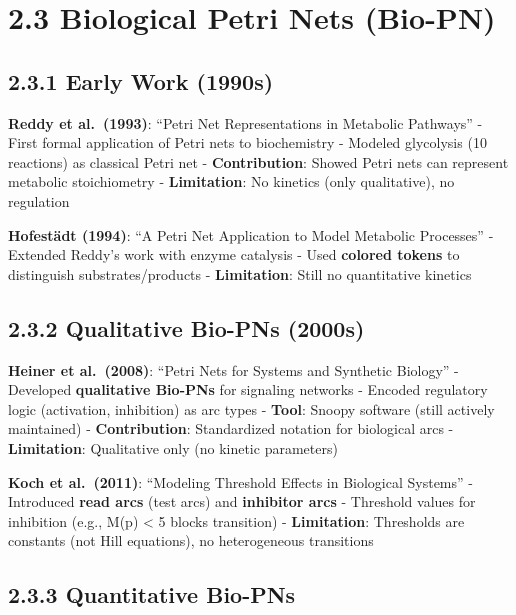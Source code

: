 \hypertarget{biological-petri-nets-bio-pn}{%
\section{2.3 Biological Petri Nets
(Bio-PN)}\label{biological-petri-nets-bio-pn}}

\hypertarget{early-work-1990s}{%
\subsection{2.3.1 Early Work (1990s)}\label{early-work-1990s}}

\textbf{Reddy et al.~(1993)}: ``Petri Net Representations in Metabolic
Pathways'' - First formal application of Petri nets to biochemistry -
Modeled glycolysis (10 reactions) as classical Petri net -
\textbf{Contribution}: Showed Petri nets can represent metabolic
stoichiometry - \textbf{Limitation}: No kinetics (only qualitative), no
regulation

\textbf{Hofestädt (1994)}: ``A Petri Net Application to Model Metabolic
Processes'' - Extended Reddy's work with enzyme catalysis - Used
\textbf{colored tokens} to distinguish substrates/products -
\textbf{Limitation}: Still no quantitative kinetics

\hypertarget{qualitative-bio-pns-2000s}{%
\subsection{2.3.2 Qualitative Bio-PNs
(2000s)}\label{qualitative-bio-pns-2000s}}

\textbf{Heiner et al.~(2008)}: ``Petri Nets for Systems and Synthetic
Biology'' - Developed \textbf{qualitative Bio-PNs} for signaling
networks - Encoded regulatory logic (activation, inhibition) as arc
types - \textbf{Tool}: Snoopy software (still actively maintained) -
\textbf{Contribution}: Standardized notation for biological arcs -
\textbf{Limitation}: Qualitative only (no kinetic parameters)

\textbf{Koch et al.~(2011)}: ``Modeling Threshold Effects in Biological
Systems'' - Introduced \textbf{read arcs} (test arcs) and
\textbf{inhibitor arcs} - Threshold values for inhibition (e.g., M(p)
\textless{} 5 blocks transition) - \textbf{Limitation}: Thresholds are
constants (not Hill equations), no heterogeneous transitions

\hypertarget{quantitative-bio-pns}{%
\subsection{2.3.3 Quantitative Bio-PNs}\label{quantitative-bio-pns}}

